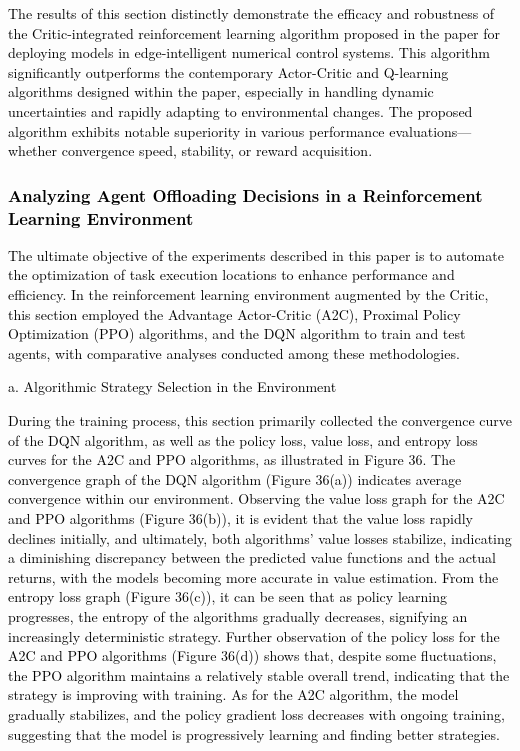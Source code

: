 \documentclass[preprint,12pt]{elsarticle}
\begin{document}
\textcolor{black}{The results of this section distinctly demonstrate the efficacy and robustness of the Critic-integrated reinforcement learning algorithm proposed in the paper for deploying models in edge-intelligent numerical control systems. This algorithm significantly outperforms the contemporary Actor-Critic and Q-learning algorithms designed within the paper, especially in handling dynamic uncertainties and rapidly adapting to environmental changes. The proposed algorithm exhibits notable superiority in various performance evaluations—whether convergence speed, stability, or reward acquisition.}


\textcolor{black}{\subsubsection{Analyzing Agent Offloading Decisions in a Reinforcement Learning Environment}}

\textcolor{black}{The ultimate objective of the experiments described in this paper is to automate the optimization of task execution locations to enhance performance and efficiency. In the reinforcement learning environment augmented by the Critic, this section employed the Advantage Actor-Critic (A2C), Proximal Policy Optimization (PPO) algorithms, and the DQN algorithm to train and test agents, with comparative analyses conducted among these methodologies.}

\textcolor{black}{a.	Algorithmic Strategy Selection in the Environment}

\textcolor{black}{During the training process, this section primarily collected the convergence curve of the DQN algorithm, as well as the policy loss, value loss, and entropy loss curves for the A2C and PPO algorithms, as illustrated in Figure 36. The convergence graph of the DQN algorithm (Figure 36(a)) indicates average convergence within our environment. Observing the value loss graph for the A2C and PPO algorithms (Figure 36(b)), it is evident that the value loss rapidly declines initially, and ultimately, both algorithms' value losses stabilize, indicating a diminishing discrepancy between the predicted value functions and the actual returns, with the models becoming more accurate in value estimation. From the entropy loss graph (Figure 36(c)), it can be seen that as policy learning progresses, the entropy of the algorithms gradually decreases, signifying an increasingly deterministic strategy. Further observation of the policy loss for the A2C and PPO algorithms (Figure 36(d)) shows that, despite some fluctuations, the PPO algorithm maintains a relatively stable overall trend, indicating that the strategy is improving with training. As for the A2C algorithm, the model gradually stabilizes, and the policy gradient loss decreases with ongoing training, suggesting that the model is progressively learning and finding better strategies.}
\end{document}

